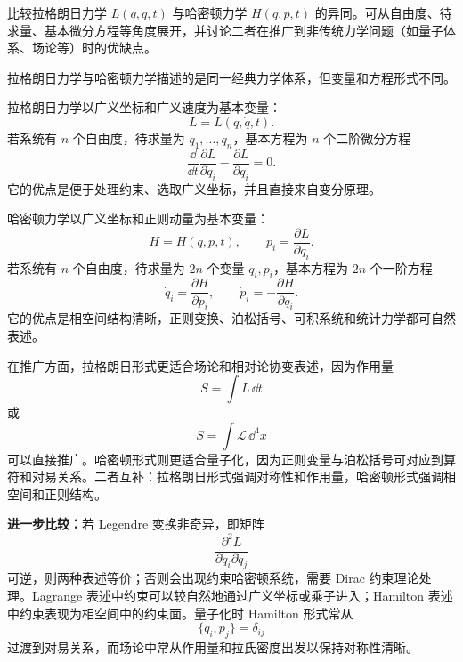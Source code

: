 \begin{question}[拉格朗日力学与哈密顿力学]
比较拉格朗日力学 $L(q,\dot q,t)$ 与哈密顿力学 $H(q,p,t)$ 的异同。可从自由度、待求量、基本微分方程等角度展开，并讨论二者在推广到非传统力学问题（如量子体系、场论等）时的优缺点。

\begin{solution}
拉格朗日力学与哈密顿力学描述的是同一经典力学体系，但变量和方程形式不同。

拉格朗日力学以广义坐标和广义速度为基本变量：
\[
  L=L(q,\dot q,t).
\]
若系统有 $n$ 个自由度，待求量为 $q_1,\dots,q_n$，基本方程为 $n$ 个二阶微分方程
\[
  \frac{\dd}{\dd t}\frac{\partial L}{\partial\dot q_i}
  -\frac{\partial L}{\partial q_i}=0.
\]
它的优点是便于处理约束、选取广义坐标，并且直接来自变分原理。

哈密顿力学以广义坐标和正则动量为基本变量：
\[
  H=H(q,p,t),
  \qquad
  p_i=\frac{\partial L}{\partial\dot q_i}.
\]
若系统有 $n$ 个自由度，待求量为 $2n$ 个变量 $q_i,p_i$，基本方程为 $2n$ 个一阶方程
\[
  \dot q_i=\frac{\partial H}{\partial p_i},
  \qquad
  \dot p_i=-\frac{\partial H}{\partial q_i}.
\]
它的优点是相空间结构清晰，正则变换、泊松括号、可积系统和统计力学都可自然表述。

在推广方面，拉格朗日形式更适合场论和相对论协变表述，因为作用量
\[
  S=\int L\,\dd t
\]
或
\[
  S=\int\mathcal L\,\dd^4x
\]
可以直接推广。哈密顿形式则更适合量子化，因为正则变量与泊松括号可对应到算符和对易关系。二者互补：拉格朗日形式强调对称性和作用量，哈密顿形式强调相空间和正则结构。


\medskip
\textbf{进一步比较：}若 Legendre 变换非奇异，即矩阵
\[
  \frac{\partial^2L}{\partial\dot q_i\partial\dot q_j}
\]
可逆，则两种表述等价；否则会出现约束哈密顿系统，需要 Dirac 约束理论处理。Lagrange 表述中约束可以较自然地通过广义坐标或乘子进入；Hamilton 表述中约束表现为相空间中的约束面。量子化时 Hamilton 形式常从
\[
  \{q_i,p_j\}=\delta_{ij}
\]
过渡到对易关系，而场论中常从作用量和拉氏密度出发以保持对称性清晰。
\end{solution}
\end{question}

